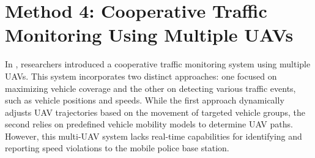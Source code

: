  
    
\section{Method 4: Cooperative Traffic Monitoring Using Multiple UAVs}
\label{sec:method4}

In \cite{elloumi2018monitoring}, researchers introduced a cooperative traffic monitoring system using multiple UAVs. This system incorporates two distinct approaches: one focused on maximizing vehicle coverage and the other on detecting various traffic events, such as vehicle positions and speeds. While the first approach dynamically adjusts UAV trajectories based on the movement of targeted vehicle groups, the second relies on predefined vehicle mobility models to determine UAV paths. However, this multi-UAV system lacks real-time capabilities for identifying and reporting speed violations to the mobile police base station.

\vspace{\baselineskip} %


